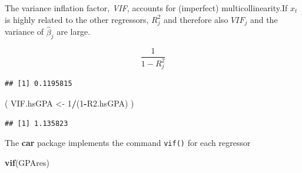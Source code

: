 \documentclass[]{book}
\newenvironment{Shaded}{\begin{snugshade}}{\end{snugshade}}
\newcommand{\CommentTok}[1]{\textcolor[rgb]{0.56,0.35,0.01}{\textit{#1}}}
\newcommand{\DataTypeTok}[1]{\textcolor[rgb]{0.13,0.29,0.53}{#1}}
\newcommand{\DecValTok}[1]{\textcolor[rgb]{0.00,0.00,0.81}{#1}}
\newcommand{\KeywordTok}[1]{\textcolor[rgb]{0.13,0.29,0.53}{\textbf{#1}}}
\newcommand{\NormalTok}[1]{#1}
\newcommand{\OperatorTok}[1]{\textcolor[rgb]{0.81,0.36,0.00}{\textbf{#1}}}
\newcommand{\StringTok}[1]{\textcolor[rgb]{0.31,0.60,0.02}{#1}}
\begin{document}
The variance inflation factor, \emph{VIF}, accounts for (imperfect)
multicollinearity.If \(x_t\) is highly related to the other regressors,
\(R^2_j\) and therefore also \(VIF_j\) and the variance of
\(\hat\beta_j\) are large.

\begin{equation}
\frac{1}{1-R^2_j}
\label{eq:VIF}
\end{equation}

\begin{Shaded}
\end{Shaded}

\begin{Shaded}
\end{Shaded}

\begin{verbatim}
## [1] 0.1195815
\end{verbatim}

\begin{Shaded}
\begin{Highlighting}[]
\NormalTok{( VIF.hsGPA <-}\StringTok{ }\DecValTok{1}\OperatorTok{/}\NormalTok{(}\DecValTok{1}\OperatorTok{-}\NormalTok{R2.hsGPA) )}
\end{Highlighting}
\end{Shaded}

\begin{verbatim}
## [1] 1.135823
\end{verbatim}

The \textbf{car} package implements the command \texttt{vif()} for each
regressor

\begin{Shaded}
\begin{Highlighting}[]
\KeywordTok{vif}\NormalTok{(GPAres)}
\end{Highlighting}
\end{Shaded}
\end{document}
